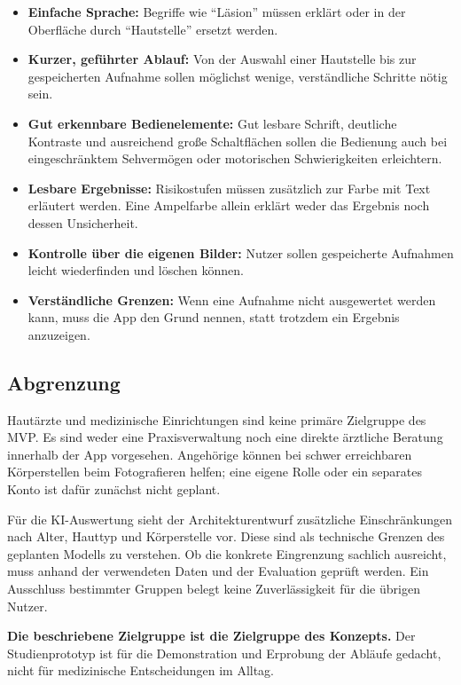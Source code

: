 \begin{itemize}
\item \textbf{Einfache Sprache:} Begriffe wie \enquote{Läsion} müssen erklärt oder in der Oberfläche durch \enquote{Hautstelle} ersetzt werden.
\item \textbf{Kurzer, geführter Ablauf:} Von der Auswahl einer Hautstelle bis zur gespeicherten Aufnahme sollen möglichst wenige, verständliche Schritte nötig sein.
\item \textbf{Gut erkennbare Bedienelemente:} Gut lesbare Schrift, deutliche Kontraste und ausreichend große Schaltflächen sollen die Bedienung auch bei eingeschränktem Sehvermögen oder motorischen Schwierigkeiten erleichtern.
\item \textbf{Lesbare Ergebnisse:} Risikostufen müssen zusätzlich zur Farbe mit Text erläutert werden. Eine Ampelfarbe allein erklärt weder das Ergebnis noch dessen Unsicherheit.
\item \textbf{Kontrolle über die eigenen Bilder:} Nutzer sollen gespeicherte Aufnahmen leicht wiederfinden und löschen können.
\item \textbf{Verständliche Grenzen:} Wenn eine Aufnahme nicht ausgewertet werden kann, muss die App den Grund nennen, statt trotzdem ein Ergebnis anzuzeigen.
\end{itemize}

\subsection{Abgrenzung}
\label{sec:zielgruppe-abgrenzung}

Hautärzte und medizinische Einrichtungen sind keine primäre Zielgruppe des MVP. Es sind weder eine Praxisverwaltung noch eine direkte ärztliche Beratung innerhalb der App vorgesehen. Angehörige können bei schwer erreichbaren Körperstellen beim Fotografieren helfen; eine eigene Rolle oder ein separates Konto ist dafür zunächst nicht geplant.

Für die KI-Auswertung sieht der Architekturentwurf zusätzliche Einschränkungen nach Alter, Hauttyp und Körperstelle vor. Diese sind als technische Grenzen des geplanten Modells zu verstehen. Ob die konkrete Eingrenzung sachlich ausreicht, muss anhand der verwendeten Daten und der Evaluation geprüft werden. Ein Ausschluss bestimmter Gruppen belegt keine Zuverlässigkeit für die übrigen Nutzer.

\textbf{Die beschriebene Zielgruppe ist die Zielgruppe des Konzepts.} Der Studienprototyp ist für die Demonstration und Erprobung der Abläufe gedacht, nicht für medizinische Entscheidungen im Alltag.
